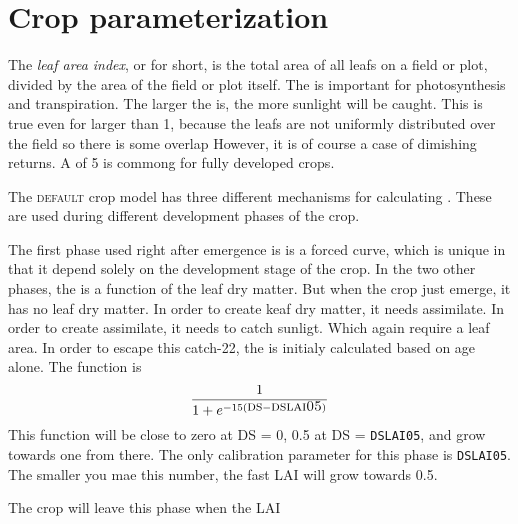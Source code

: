 \documentclass[a4paper]{article}
\begin{document}
\section*{Crop \lai{} parameterization}

The \emph{leaf area index}, or \lai{} for short, is the total area of
all leafs on a field or plot, divided by the area of the field or plot
itself.  The \lai{} is important for photosynthesis and transpiration.
The larger the \lai{} is, the more sunlight will be caught.  This is
true even for \lai{} larger than 1, because the leafs are not
uniformly distributed over the field so there is some overlap
However, it is of course a case of dimishing returns.  A \lai{} of 5
is commong for fully developed crops.

The \textsc{default} crop model has three different mechanisms for
calculating \lai{}.  These are used during different development
phases of the crop.

The first phase used right after emergence is is a forced curve, which
is unique in that it depend solely on the development stage of the
crop.  In the two other phases, the \lai{} is a function of the leaf
dry matter.  But when the crop just emerge, it has no leaf dry
matter.  In order to create keaf dry matter, it needs assimilate.  In
order to create assimilate, it needs to catch sunligt.  Which again
require a leaf area.  In order to escape this catch-22, the \lai{} is
initialy calculated based on age alone.  The function is
\begin{displaymath}
\frac{1}{1+e^{-15 (\mbox{\sc ds}-\mbox{\sc dslai05})}}
\end{displaymath}
This function will be close to zero at DS = 0, 0.5 at DS =
\texttt{DSLAI05}, and grow towards one from there.  The only
calibration parameter for this phase is \texttt{DSLAI05}.  The smaller
you mae this number, the fast LAI will grow towards 0.5.

The crop will leave this phase when the LAI
\end{document}
